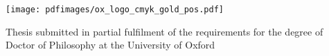 \documentclass[dissertation]{subfiles}
\begin{document}
\hypertarget{titlepage}{}

\begin{titlepage}

\begin{center}

\vspace*{36pt}

\newlength{\titlewordspace}
\setlength{\titlewordspace}{.7em}

\newlength{\titlecharspace}
\setlength{\titlecharspace}{1pt}


\vspace{36pt}



\vspace{\fill}
\vspace{\fill}

\texttt{[image: pdfimages/ox\_logo\_cmyk\_gold\_pos.pdf]}

\vspace{\fill}

Thesis submitted in partial fulfilment of the requirements for the degree of Doctor of Philosophy at the University of Oxford

\timestamp

\end{center}

\end{titlepage}
\end{document}
